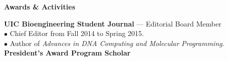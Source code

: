 \documentclass[11pt]{article}
\newcommand{\sectionheader}[1]{\noindent \textbf{\large #1}}
\newenvironment{sectionbody}{\begin{adjustwidth}{6mm}{}}{\end{adjustwidth}}
\begin{document}
\vspace{2mm}

\sectionheader{Awards \& Activities}
\begin{sectionbody}
{\bf UIC Bioengineering Student Journal} --- Editorial Board Member \\
$\bullet$ Chief Editor from Fall 2014 to Spring 2015. \\
$\bullet$ Author of {\it Advances in DNA Computing and Molecular Programming}. \\
{\bf President's Award Program Scholar} \\
\end{sectionbody}

\vspace{2mm}
\end{document}
